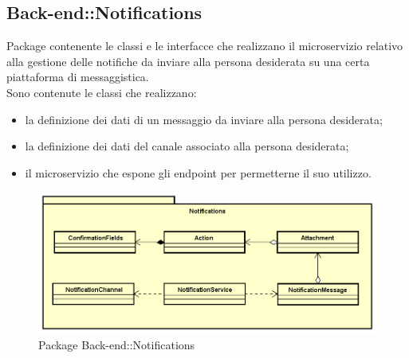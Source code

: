 \subsection{Back-end::Notifications}
Package contenente le classi e le interfacce che realizzano il microservizio relativo alla gestione delle notifiche da inviare alla persona desiderata su una certa piattaforma di messaggistica.\\ Sono contenute le classi che realizzano: \begin{itemize} \item la definizione dei dati di un messaggio da inviare alla persona desiderata; \item la definizione dei dati del canale associato alla persona desiderata; \item il microservizio che espone gli endpoint per permetterne il suo utilizzo. \end{itemize}
\begin{figure}[h] \centering \includegraphics[width=\textwidth,height=\textheight,keepaspectratio]{images/diagrams/back-end/Official_Backend_0304/Notifications.png}
	\caption{Package Back-end::Notifications}
\end{figure}
\newpage

